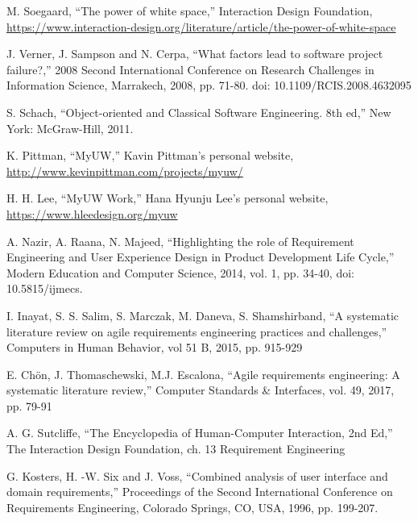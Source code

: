 \documentclass[conference]{IEEEtran}
\begin{document}
\begin{thebibliography}{00}
 M. Soegaard, ``The power of white space,'' Interaction Design Foundation, \url{https://www.interaction-design.org/literature/article/the-power-of-white-space}

 J. Verner, J. Sampson and N. Cerpa, ``What factors lead to software project failure?,'' 2008 Second International Conference on Research Challenges in Information Science, Marrakech, 2008, pp. 71-80. doi: 10.1109/RCIS.2008.4632095

 S. Schach, ``Object-oriented and Classical Software Engineering. 8th ed,'' New York: McGraw-Hill, 2011.

 K. Pittman, ``MyUW,'' Kavin Pittman's personal website, \url{http://www.kevinpittman.com/projects/myuw/} 

 H. H. Lee, ``MyUW Work,'' Hana Hyunju Lee's personal website, \url{https://www.hleedesign.org/myuw}

 A. Nazir, A. Raana, N. Majeed, ``Highlighting the role of Requirement Engineering and User Experience Design in Product Development Life Cycle,'' Modern Education and Computer Science, 2014, vol. 1, pp. 34-40, doi: 10.5815/ijmecs.

 I. Inayat, S. S. Salim, S. Marczak, M. Daneva, S. Shamshirband, ``A systematic literature review on agile requirements engineering practices and challenges,'' Computers in Human Behavior, vol 51 B, 2015, pp. 915-929

 E. Chön, J. Thomaschewski, M.J. Escalona, ``Agile requirements engineering: A systematic literature review,'' Computer Standards & Interfaces, vol. 49, 2017, pp. 79-91

 A. G. Sutcliffe, ``The Encyclopedia of Human-Computer Interaction, 2nd Ed,'' The Interaction Design Foundation, ch. 13 Requirement Engineering

 G. Kosters, H. -W. Six and J. Voss, ``Combined analysis of user interface and domain requirements,'' Proceedings of the Second International Conference on Requirements Engineering, Colorado Springs, CO, USA, 1996, pp. 199-207.
\end{thebibliography}

\vspace{12pt}
\end{document}
